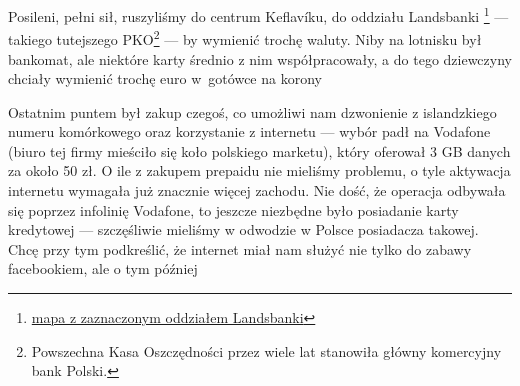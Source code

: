 

Posileni, pełni sił, ruszyliśmy do centrum Keflavíku, do oddziału Landsbanki \footnote{\href{https://www.google.com/url?q=https\%3A\%2F\%2Fmaps.google.com\%2Fmaps\%3Fq\%3D63.995522\%2C-22.548067}{mapa z zaznaczonym oddziałem Landsbanki}} --- takiego tutejszego PKO\footnote{Powszechna Kasa Oszczędności przez wiele lat stanowiła główny komercyjny bank Polski.} --- by wymienić trochę waluty. Niby na lotnisku był bankomat, ale niektóre karty średnio z nim współpracowały, a do tego dziewczyny chciały wymienić trochę euro w~gotówce na korony\textellipsis


Ostatnim puntem był zakup czegoś, co umożliwi nam dzwonienie z islandzkiego numeru komórkowego oraz korzystanie z internetu --- wybór padł na Vodafone (biuro tej firmy mieściło się koło polskiego marketu), który oferował 3 GB danych za około 50 zł. O ile z zakupem prepaidu nie mieliśmy problemu, o tyle aktywacja internetu wymagała już znacznie więcej zachodu. Nie dość, że operacja odbywała się poprzez infolinię Vodafone, to jeszcze niezbędne było posiadanie karty kredytowej --- szczęśliwie mieliśmy w odwodzie w Polsce posiadacza takowej. Chcę przy tym podkreślić, że internet miał nam służyć nie tylko do zabawy facebookiem, ale o tym później\textellipsis

